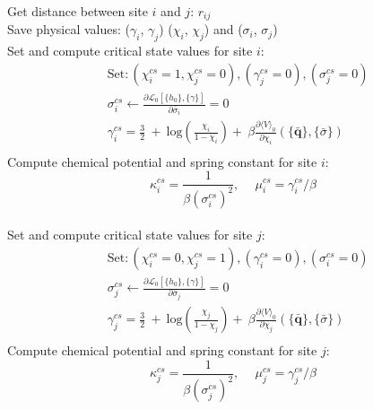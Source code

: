 \documentclass{article}
\begin{document}
    
    \begin{algorithm}
    \caption{Energy barrier algorithm between sites i and j (Meanfield Approximation)}\label{alg:explicit-master-equation}
    \begin{algorithmic}
        \State Get distance between site $i$ and $j$: $r_{ij}$\\
        
        \State Save physical values: ($\gamma_i$, $\gamma_j$) ($\chi_i$, $\chi_j$) and ($\sigma_i$, $\sigma_j$)\\
    
        \State Set and compute critical state values for site $i$:
        \begin{align*}
        &\text{Set}: (\chi_i^{cs} = 1, \chi_j^{cs} = 0), (\gamma_j^{cs} = 0), (\sigma_j^{cs} = 0) \\
        &\sigma^{cs}_i \leftarrow \frac{\partial \mathcal{L}_0[\{h_0\}, \{\gamma\}]}{\partial \bar{\sigma}_i} = 0\\
        &\gamma_i^{cs} = \frac{3}{2}\ +\ \text{log}\left(\frac{\chi_i}{1 - \chi_i}\right) +\ \beta \frac{\partial \langle V \rangle_0}{\partial \chi_i}(\{\bar{\textbf{q}}\},\{\bar{\sigma}\}) \\
        \end{align*}
    \State Compute chemical potential and spring constant for site $i$:
    \begin{equation*}
        \kappa_i^{cs} = \frac{1}{\beta (\sigma_i^{cs})^2},\ \quad \mu_i^{cs} = \gamma_i^{cs} / \beta
    \end{equation*}\\
    
        \State Set and compute critical state values for site $j$:
        \begin{align*}
        &\text{Set}: (\chi_i^{cs} = 0, \chi_j^{cs} = 1), (\gamma_i^{cs} = 0), (\sigma_i^{cs} = 0) \\
        &\sigma^{cs}_j \leftarrow \frac{\partial \mathcal{L}_0[\{h_0\}, \{\gamma\}]}{\partial \bar{\sigma}_j} = 0\\
        &\gamma_j^{cs} = \frac{3}{2}\ +\ \text{log}\left(\frac{\chi_j}{1 - \chi_j}\right) +\ \beta \frac{\partial \langle V \rangle_0}{\partial \chi_j}(\{\bar{\textbf{q}}\},\{\bar{\sigma}\}) \\
        \end{align*}
    \State Compute chemical potential and spring constant for site $j$:
    \begin{equation*}
        \kappa_j^{cs} = \frac{1}{\beta (\sigma_j^{cs})^2},\ \quad \mu_j^{cs} = \gamma_j^{cs} / \beta
    \end{equation*}\\
    

\end{algorithmic}
\end{algorithm}
\end{document}
